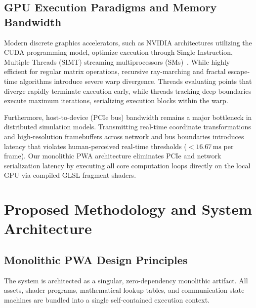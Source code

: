 \documentclass[10pt,journal,compsoc]{IEEEtran}
\begin{document}
\subsection{GPU Execution Paradigms and Memory Bandwidth}
Modern discrete graphics accelerators, such as NVIDIA architectures utilizing the CUDA programming model, optimize execution through Single Instruction, Multiple Threads (SIMT) streaming multiprocessors (SMs)~\cite{cuda12programming, sanders2010cuda}. While highly efficient for regular matrix operations, recursive ray-marching and fractal escape-time algorithms introduce severe warp divergence. Threads evaluating points that diverge rapidly terminate execution early, while threads tracking deep boundaries execute maximum iterations, serializing execution blocks within the warp.

Furthermore, host-to-device (PCIe bus) bandwidth remains a major bottleneck in distributed simulation models. Transmitting real-time coordinate transformations and high-resolution framebuffers across network and bus boundaries introduces latency that violates human-perceived real-time thresholds ($<16.67\,\text{ms}$ per frame). Our monolithic PWA architecture eliminates PCIe and network serialization latency by executing all core computation loops directly on the local GPU via compiled GLSL fragment shaders.

\section{Proposed Methodology and System Architecture}
\subsection{Monolithic PWA Design Principles}
The system is architected as a singular, zero-dependency monolithic artifact. All assets, shader programs, mathematical lookup tables, and communication state machines are bundled into a single self-contained execution context. 
\end{document}
